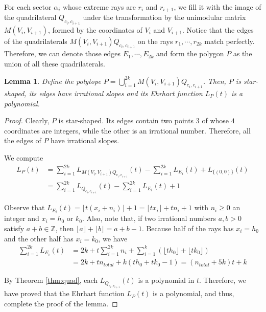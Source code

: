 \documentclass[a4paper]{article}
\newtheorem{lem}{Lemma}
\begin{document}
For each sector $\alpha_i$ whose extreme rays are $r_i$ and $r_{i+1}$, we fill it with the image of the quadrilateral $Q_{c_i,c_{i+1}}$ under the transformation by the unimodular matrix $M(V_i,V_{i+1})$, formed by the coordinates of $V_i$ and $V_{i+1}$. Notice that the edges of the quadrilaterals $M(V_i,V_{i+1}) Q_{c_i,c_{i+1}}$ on the rays $r_1, \cdots, r_{2k}$ match perfectly. Therefore, we can denote those edges $E_1, \cdots, E_{2k}$ and form the polygon $P$ as the union of all these quadrilaterals. 

\begin{lem}\label{lem:elab}
	Define the polytope $P = \bigcup_{i=1}^{2k} M(V_i,V_{i+1}) Q_{c_i,c_{i+1}}$. Then, $P$ is star-shaped, its edges have irrational slopes and its Ehrhart function $L_P(t)$ is a polynomial.
\end{lem}

\begin{proof}
Clearly, $P$ is star-shaped. Its edges contain two points $3$ of whose $4$ coordinates are integers, while the other is an irrational number. Therefore, all the edges of $P$ have irrational slopes.

We compute
\begin{align}
	L_P (t) &= \sum_{i=1}^{2k} L_{M(V_i,V_{i+1}) Q_{c_i,c_{i+1}}} (t) - \sum_{i=1}^{2k} L_{E_i} (t)  + L_{\{(0,0)\}} (t) \nonumber \\
    	&= \sum_{i=1}^{2k} L_{Q_{c_i,c_{i+1}}} (t) - \sum_{i=1}^{2k} L_{E_i} (t) + 1
\end{align}

Observe that $L_{E_i} (t) = \lfloor t(x_i+n_i) \rfloor + 1 = \lfloor tx_i \rfloor + tn_i + 1$ with $n_i \geq 0$ an integer and $x_i = h_0$ or $k_0$. Also, note that, if two irrational numbers $a,b > 0$ satisfy $a + b \in \mathbb{Z}$, then $\lfloor a \rfloor + \lfloor b \rfloor = a + b - 1$. Because half of the rays has $x_i = h_0$ and the other half has $x_i = k_0$, we have
\begin{align}
	\sum_{i=1}^{2k} L_{E_i} (t) &= 2k + t \sum_{i=1}^{2k} n_i + \sum_{i=1}^{k} (\lfloor th_0 \rfloor + \lfloor t k_0 \rfloor) \nonumber \\
    	&= 2k + t n_{total} + k (th_0 + tk_0 - 1) = (n_{total} + 5k) t + k
\end{align}

By Theorem \ref{thm:quad}, each $L_{Q_{c_i,c_{i+1}}} (t)$ is a polynomial in $t$. Therefore, we have proved that the Ehrhart function $L_P(t)$ is a polynomial, and thus, complete the proof of the lemma.
\end{proof}
\end{document}
